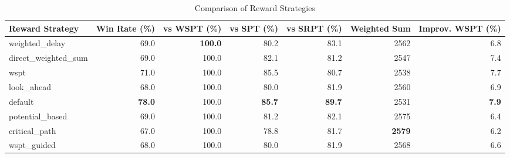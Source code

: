 \begin{table}[htbp]%
\centering%
\begin{tabular}{lrrrrrr}%
\toprule%
\textbf{Reward Strategy}&\textbf{Win Rate (\%)}&\textbf{vs WSPT (\%)}&\textbf{vs SPT (\%)}&\textbf{vs SRPT (\%)}&\textbf{Weighted Sum}&\textbf{Improv. WSPT (\%)}\\%
\midrule%
weighted_delay&69.0&\textbf{100.0}&80.2&83.1&2562&6.8\\%
direct_weighted_sum&69.0&100.0&82.1&81.2&2547&7.4\\%
wspt&71.0&100.0&85.5&80.7&2538&7.7\\%
look_ahead&68.0&100.0&80.0&81.9&2560&6.9\\%
default&\textbf{78.0}&100.0&\textbf{85.7}&\textbf{89.7}&2531&\textbf{7.9}\\%
potential_based&69.0&100.0&81.2&82.1&2575&6.4\\%
critical_path&67.0&100.0&78.8&81.7&\textbf{2579}&6.2\\%
wspt_guided&68.0&100.0&80.0&81.9&2568&6.6\\%
\bottomrule%
\end{tabular}%
\caption{Comparison of Reward Strategies}%
\label{tab:rewards}%
\end{table}